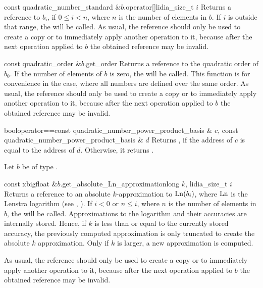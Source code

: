 \begin{cfcode}{const quadratic_number_standard &}{$b$.operator[]}{lidia_size_t $i$}
  Returns a  reference to $b_i$, if $0 \leq i < n$, where $n$ is the number of
  elements in $b$.  If $i$ is outside that range, the \LEH will be called.  As usual, the
   reference should only be used to create a copy or to immediately apply another
  operation to it, because after the next operation applied to $b$ the obtained reference may be
  invalid.
\end{cfcode}

\begin{cfcode}{const quadratic_order &}{$b$.get_order}{}
  Returns a  reference to the quadratic order of $b_0$.  If the number of elements
  of $b$ is zero, the \LEH will be called.  This function is for convenience in the case, where
  all numbers are defined over the same order.  As usual, the  reference should only
  be used to create a copy or to immediately apply another operation to it, because after the
  next operation applied to $b$ the obtained reference may be invalid.
\end{cfcode}



\COMP

\begin{fcode}{bool}{operator==}{const quadratic_number_power_product_basis & $c$,
    const quadratic_number_power_product_basis & $d$}%
  Returns \TRUE, if the address of $c$ is equal to the address of $d$.  Otherwise, it returns
  \FALSE.
\end{fcode}



\BASIC

Let $b$ be of type .

\begin{cfcode}{const xbigfloat &}{$b$.get_absolute_Ln_approximation}{long $k$, lidia_size_t $i$}
  Returns a  reference to an absolute $k$-approximation to $\operatorname{Ln}(b_i)$, where $\operatorname{Ln}$
  is the Lenstra logarithm (see , ).  If $i < 0$
  or $n \leq i$, where $n$ is the number of elements in $b$, the \LEH will be called.
  Approximations to the logarithm and their accuracies are internally stored.  Hence, if $k$ is
  less than or equal to the currently stored accuracy, the previously computed approximation is
  only truncated to create the absolute $k$ approximation.  Only if $k$ is larger, a new
  approximation is computed.
  
  As usual, the  reference should only be used to create a copy or to immediately
  apply another operation to it, because after the next operation applied to $b$ the obtained
  reference may be invalid.
\end{cfcode}

